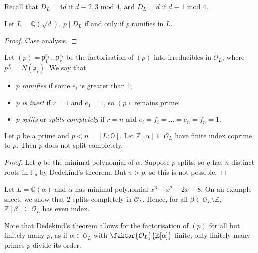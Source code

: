 Recall that \( D_L = 4d \) if \( d \equiv 2, 3 \text{ mod } 4 \), and \( D_L = d \) if \( d \equiv 1 \text{ mod } 4 \).
\begin{corollary}
    Let \( L = \mathbb Q(\sqrt{d}) \).
    \( p \mid D_L \) if and only if \( p \) ramifies in \( L \).
\end{corollary}
\begin{proof}
    Case analysis.
\end{proof}
\begin{definition}
    Let \( (p) = \mathfrak p_1^{e_1} \dots \mathfrak p_r^{e_r} \) be the factorisation of \( (p) \) into irreducibles in \( \mathcal O_L \), where \( p^{f_i} = N(\mathfrak p_i) \).
    We say that
    \begin{itemize}
        \item \( p \) \emph{ramifies} if some \( e_i \) is greater than 1;
        \item \( p \) \emph{is inert} if \( r = 1 \) and \( e_1 = 1 \), so \( (p) \) remains prime;
        \item \( p \) \emph{splits} or \emph{splits completely} if \( r = n \) and \( e_i = f_i = \dots = e_n = f_n = 1 \).
    \end{itemize}
\end{definition}
\begin{corollary}
    Let \( p \) be a prime and \( p < n = [L:\mathbb Q] \).
    Let \( \mathbb Z[\alpha] \subseteq \mathcal O_L \) have finite index coprime to \( p \).
    Then \( p \) does not split completely.
\end{corollary}
\begin{proof}
    Let \( g \) be the minimal polynomial of \( \alpha \).
    Suppose \( p \) splits, so \( g \) has \( n \) distinct roots in \( \mathbb F_p \) by Dedekind's theorem.
    But \( n > p \), so this is not possible.
\end{proof}
\begin{example}
    Let \( L = \mathbb Q(\alpha) \) and \( \alpha \) has minimal polynomial \( x^3 - x^2 - 2x - 8 \).
    On an example sheet, we show that 2 splits completely in \( \mathcal O_L \).
    Hence, for all \( \beta \in \mathcal O_L \setminus \mathbb Z \), \( \mathbb Z[\beta] \subseteq \mathcal O_L \) has even index.
\end{example}
Note that Dedekind's theorem allows for the factorisation of \( (p) \) for all but finitely many \( p \), as if \( \alpha \in \mathcal O_L \) with \( \faktor{\mathcal O_L}{\mathbb Z[\alpha]} \) finite, only finitely many primes \( p \) divide its order.
